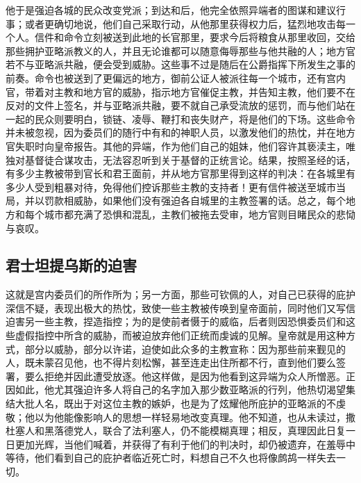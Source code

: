 他于是强迫各城的民众改变党派；到达和后，他完全依照异端者的图谋和建议行事；或者更确切地说，他们自己采取行动，从他那里获得权力后，猛烈地攻击每一个人。信件和命令立刻被送到此地的长官那里，要求今后将粮食从那里收回，交给那些拥护亚略派教义的人，并且无论谁都可以随意侮辱那些与他共融的人；地方官若不与亚略派共融，便会受到威胁。这些事不过是随后在公爵指挥下所发生之事的前奏。命令也被送到了更偏远的地方，御前公证人被派往每一个城市，还有宫内官，带着对主教和地方官的威胁，指示地方官催促主教，并告知主教，他们要不在反对的文件上签名，并与亚略派共融，要不就自己承受流放的惩罚，而与他们站在一起的民众则要明白，锁链、凌辱、鞭打和丧失财产，将是他们的下场。这些命令并未被忽视，因为委员们的随行中有和的神职人员，以激发他们的热忱，并在地方官失职时向皇帝报告。其他的异端，作为他们自己的姐妹，他们容许其亵渎主，唯独对基督徒合谋攻击，无法容忍听到关于基督的正统言论。结果，按照圣经的话，有多少主教被带到官长和君王面前，并从地方官那里得到这样的判决：在各城里有多少人受到粗暴对待，免得他们控诉那些主教的支持者！更有信件被送至城市当局，并以罚款相威胁，如果他们没有强迫各自城里的主教签署的话。总之，每个地方和每个城市都充满了恐惧和混乱，主教们被拖去受审，地方官则目睹民众的悲恸与哀叹。\par


\subsection{君士坦提乌斯的迫害}

这就是宫内委员们的所作所为；另一方面，那些可钦佩的人，对自己已获得的庇护深信不疑，表现出极大的热忱，致使一些主教被传唤到皇帝面前，同时他们又写信迫害另一些主教，捏造指控；为的是使前者慑于的威临，后者则因恐惧委员们和这些虚假指控中所含的威胁，而被迫放弃他们正统而虔诚的见解。皇帝就是用这种方式，部分以威胁，部分以许诺，迫使如此众多的主教宣称：因为那些前来觐见的人，既未蒙召见他，也不得片刻松懈，甚至连走出住所都不行，直到他们要么签署，要么拒绝并因此遭受放逐。他这样做，是因为他看到这异端为众人所憎恶。正因如此，他尤其强迫许多人将自己的名字加入那少数亚略派的行列，他热切渴望集结大批人名，既出于对这位主教的嫉妒，也是为了炫耀他所庇护的亚略派的不虔敬；他以为他能像影响人的思想一样轻易地改变真理。他不知道，也从未读过，撒杜塞人和黑落德党人，联合了法利塞人，仍不能模糊真理；相反，真理因此日复一日更加光辉，当他们喊着，并获得了有利于他们的判决时，却仍被遗弃，在羞辱中等待，他们看到自己的庇护者临近死亡时，料想自己不久也将像鹧鸪一样失去一切。\par

